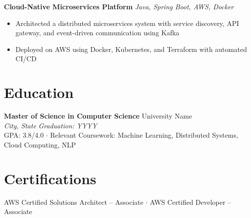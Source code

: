 \documentclass[11pt,letterpaper]{article}
\begin{document}
\textbf{Cloud-Native Microservices Platform} \hfill \textit{Java, Spring Boot, AWS, Docker}
\begin{itemize}
    \item Architected a distributed microservices system with service discovery, API gateway, and event-driven communication using Kafka
    \item Deployed on AWS using Docker, Kubernetes, and Terraform with automated CI/CD
\end{itemize}

\section{Education}

\textbf{Master of Science in Computer Science} \hfill University Name \\
\textit{City, State} \hfill \textit{Graduation: YYYY} \\
GPA: 3.8/4.0 $\cdot$ Relevant Coursework: Machine Learning, Distributed Systems, Cloud Computing, NLP

\section{Certifications}
AWS Certified Solutions Architect -- Associate $\cdot$
AWS Certified Developer -- Associate
\end{document}
